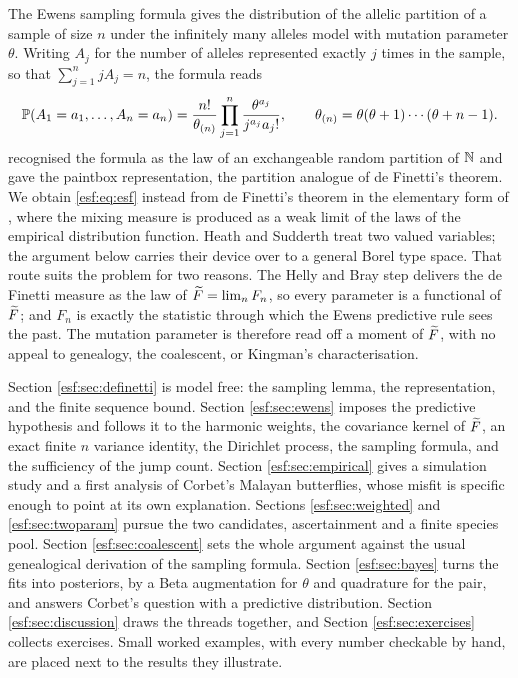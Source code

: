 The Ewens sampling formula \citep{esf:ewens1972} gives the distribution of the allelic
partition of a sample of size $n$ under the infinitely many alleles model with
mutation parameter $\theta$. Writing $A_j$ for the number of alleles represented
exactly $j$ times in the sample, so that $\sum_{j=1}^{n} j A_j = n$, the formula reads
\begin{equation}
\mathbb{P}(A_1 = a_1, \dots, A_n = a_n)
= \frac{n!}{\theta_{(n)}} \prod_{j=1}^{n} \frac{\theta^{a_j}}{j^{a_j} a_j!},
\qquad \theta_{(n)} = \theta(\theta+1)\cdots(\theta+n-1).
\label{esf:eq:esf}
\end{equation}
\citet{esf:kingman1978} recognised the formula as the law of an exchangeable random partition
of $\mathbb{N}$ and gave the paintbox representation, the partition analogue of de Finetti's
theorem. We obtain \eqref{esf:eq:esf} instead from de Finetti's theorem in the elementary
form of \citet{esf:heath1976}, where the mixing measure is produced as a weak
limit of the laws of the empirical distribution function. Heath and Sudderth treat two
valued variables; the argument below carries their device over to a general Borel type
space. That route suits the problem
for two reasons. The Helly and Bray step delivers the de Finetti measure as the law of
$\widetilde{F} = \lim_n F_n$, so every parameter is a functional of $\widetilde{F}$; and $F_n$ is
exactly the statistic through which the Ewens predictive rule sees the past. The
mutation parameter is therefore read off a moment of $\widetilde{F}$, with no appeal to
genealogy, the coalescent, or Kingman's characterisation.

Section \ref{esf:sec:definetti} is model free: the sampling lemma, the representation, and
the finite sequence bound. Section \ref{esf:sec:ewens} imposes the predictive hypothesis
and follows it to the harmonic weights, the covariance kernel of $\widetilde{F}$, an exact
finite $n$ variance identity, the Dirichlet process, the sampling formula, and the
sufficiency of the jump count. Section \ref{esf:sec:empirical} gives a simulation study
and a first analysis of Corbet's Malayan butterflies, whose misfit is specific enough
to point at its own explanation. Sections \ref{esf:sec:weighted} and \ref{esf:sec:twoparam}
pursue the two candidates, ascertainment and a finite species pool. Section
\ref{esf:sec:coalescent} sets the whole argument against the usual genealogical derivation
of the sampling formula. Section \ref{esf:sec:bayes} turns the fits into posteriors, by a Beta augmentation for $\theta$
and quadrature for the pair, and answers Corbet's question with a predictive
distribution. Section \ref{esf:sec:discussion} draws the threads together, and
Section \ref{esf:sec:exercises} collects exercises. Small worked examples, with every
number checkable by hand, are placed next to the results they illustrate.

